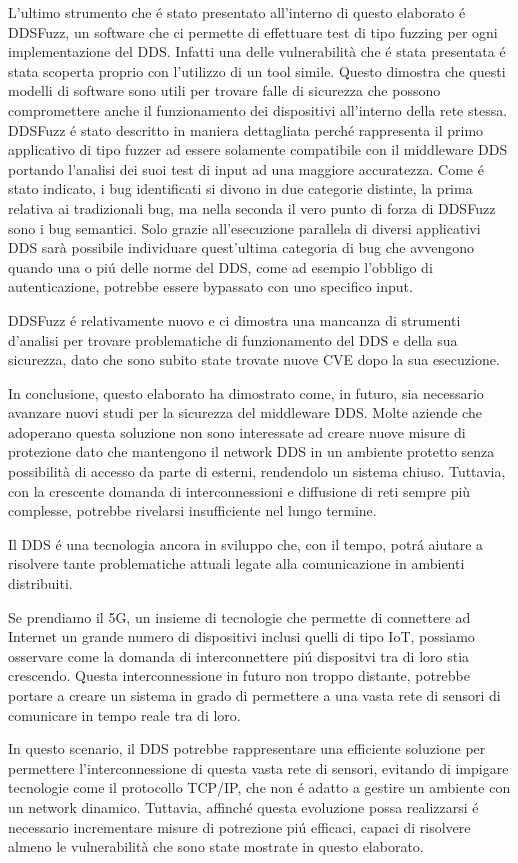 L'ultimo strumento che é stato presentato all'interno di questo 
elaborato é DDSFuzz, un software che ci permette di effettuare test 
di tipo fuzzing per ogni implementazione del DDS. Infatti una delle 
vulnerabilità che é stata presentata é stata scoperta proprio 
con l'utilizzo di un tool simile. Questo dimostra che questi 
modelli di software sono utili per trovare falle di sicurezza 
che possono compromettere anche il funzionamento dei dispositivi
all'interno della rete stessa. 
DDSFuzz é stato descritto in maniera dettagliata
perché rappresenta il primo applicativo di tipo fuzzer ad essere
solamente  
compatibile con il middleware DDS portando l'analisi dei suoi test di 
input ad una maggiore accuratezza. Come é stato indicato, i bug identificati
si divono in due categorie distinte, la prima relativa ai tradizionali 
bug, ma nella seconda il vero punto di forza di DDSFuzz
sono i bug semantici.
Solo grazie all'esecuzione parallela di diversi applicativi DDS 
sarà possibile
individuare quest'ultima categoria di bug che avvengono quando 
una o piú delle norme del DDS, come ad esempio l'obbligo di 
autenticazione, potrebbe essere bypassato con uno specifico input.

DDSFuzz é relativamente nuovo e ci dimostra 
una mancanza di strumenti d'analisi 
per trovare problematiche di funzionamento
del DDS e della sua sicurezza, dato che sono subito state trovate 
nuove CVE dopo la sua esecuzione. 

In conclusione, questo elaborato ha dimostrato come, in futuro,
sia necessario avanzare nuovi studi per la sicurezza del 
middleware DDS. Molte aziende che adoperano questa soluzione 
non sono interessate ad creare nuove misure di protezione dato che 
mantengono il network DDS in un ambiente 
protetto senza possibilità di accesso da parte di esterni, 
rendendolo un sistema chiuso. 
Tuttavia, con la crescente domanda di interconnessioni
e diffusione di reti sempre più complesse, 
potrebbe rivelarsi insufficiente nel lungo termine.

Il DDS é una tecnologia ancora in 
sviluppo che, con il tempo, potrá aiutare a risolvere tante 
problematiche attuali legate alla comunicazione in 
ambienti distribuiti. 

Se prendiamo il 5G, un insieme di tecnologie che permette 
di connettere ad Internet un grande numero di dispositivi
inclusi quelli di tipo IoT, 
possiamo osservare come la domanda di interconnettere piú dispositvi 
tra di loro stia crescendo. Questa interconnessione in futuro 
non troppo distante, potrebbe portare a creare un sistema in 
grado di permettere a una vasta rete di 
sensori di comunicare in tempo reale 
tra di loro.

In questo scenario, il DDS potrebbe rappresentare una efficiente
soluzione per permettere l'interconnessione di questa vasta 
rete di sensori, evitando di impigare tecnologie come il 
protocollo TCP/IP, che non é adatto a gestire un ambiente con 
un network dinamico. Tuttavia, affinché questa evoluzione possa 
realizzarsi é necessario incrementare misure di potrezione 
piú efficaci, capaci di risolvere almeno le vulnerabilità che 
sono state mostrate in questo elaborato.


